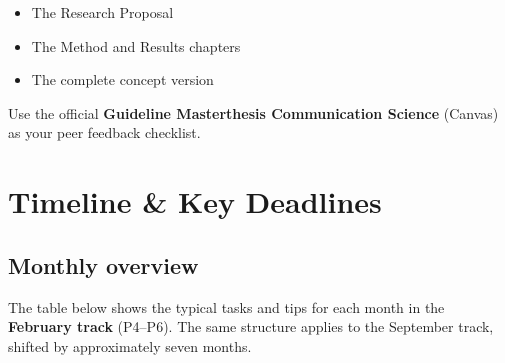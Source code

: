 \documentclass[
  11pt,
  a4paper,
]{scrbook}
\providecommand{\tightlist}{%
  \setlength{\itemsep}{0pt}\setlength{\parskip}{0pt}}\usepackage{longtable,booktabs,array}
\begin{document}
\begin{itemize}
\tightlist
\item
  The Research Proposal
\item
  The Method and Results chapters
\item
  The complete concept version
\end{itemize}

Use the official \textbf{Guideline Masterthesis Communication Science}
(Canvas) as your peer feedback checklist.

\chapter{Timeline \& Key Deadlines}\label{timeline-key-deadlines}

\section{Monthly overview}\label{monthly-overview}

The table below shows the typical tasks and tips for each month in the
\textbf{February track} (P4--P6). The same structure applies to the
September track, shifted by approximately seven months.
\end{document}

